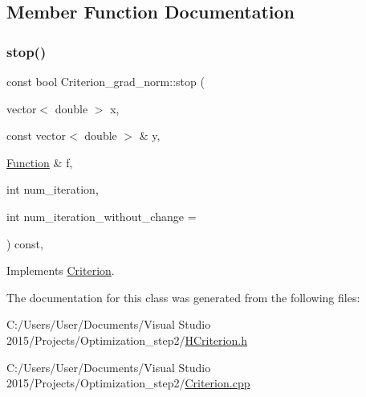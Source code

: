 \subsection{Member Function Documentation}
\mbox{\label{class_criterion__grad__norm_ae95aa823069c1fcbcd333eacd00f78c9}} 
\subsubsection{\texorpdfstring{stop()}{stop()}}
{\footnotesize\ttfamily const bool Criterion\+\_\+grad\+\_\+norm\+::stop (\begin{DoxyParamCaption}\item[{vector$<$ double $>$}]{x,  }\item[{const vector$<$ double $>$ \&}]{y,  }\item[{\hyperlink{class_function}{Function} \&}]{f,  }\item[{int}]{num\+\_\+iteration,  }\item[{int}]{num\+\_\+iteration\+\_\+without\+\_\+change = {} }\end{DoxyParamCaption}) const\hspace{0.3cm}{\ttfamily [override]}, {\ttfamily [virtual]}}



Implements \hyperlink{class_criterion_aee3e2148c665c72c50c2f870a3ca8cdc}{Criterion}.



The documentation for this class was generated from the following files\+:\begin{DoxyCompactItemize}
\item 
C\+:/\+Users/\+User/\+Documents/\+Visual Studio 2015/\+Projects/\+Optimization\+\_\+step2/\hyperlink{_h_criterion_8h}{H\+Criterion.\+h}\item 
C\+:/\+Users/\+User/\+Documents/\+Visual Studio 2015/\+Projects/\+Optimization\+\_\+step2/\hyperlink{_criterion_8cpp}{Criterion.\+cpp}\end{DoxyCompactItemize}
